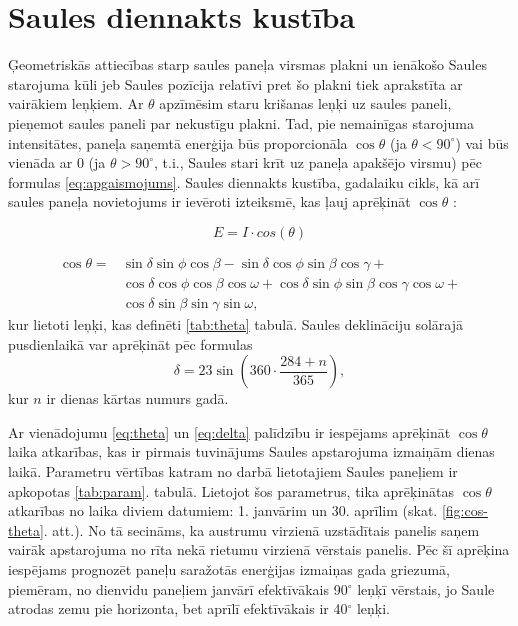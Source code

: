 
\section{Saules diennakts kustība}

Ģeometriskās attiecības starp saules paneļa virsmas plakni un ienākošo Saules starojuma kūli jeb Saules pozīcija relatīvi pret šo plakni tiek aprakstīta ar vairākiem leņķiem. Ar $\theta$ apzīmēsim staru krišanas leņķi uz saules paneli, pieņemot saules paneli par nekustīgu plakni. Tad, pie nemainīgas starojuma intensitātes, paneļa saņemtā enerģija būs proporcionāla $\cos{\theta}$ (ja $\theta<90^\circ$) vai būs vienāda ar 0 (ja $\theta>90^\circ$, t.i., Saules stari krīt uz paneļa apakšējo virsmu) pēc formulas \ref{eq:apgaismojums}. Saules diennakts kustība, gadalaiku cikls, kā arī saules paneļa novietojums ir ievēroti izteiksmē, kas ļauj aprēķināt $\cos{\theta}$ \cite{ThermalProcesses}:

\begin{equation}
\label{eq:apgaismojums}
E = I \cdot cos(\theta)
\end{equation}

\begin{equation}
\label{eq:theta}
\begin{aligned}
	\cos{\theta} = {} & \sin{\delta} \sin{\phi} \cos{\beta} - \sin{\delta} \cos{\phi} \sin{\beta} \cos{\gamma} +                           \\
	                  & \cos{\delta} \cos{\phi} \cos{\beta} \cos{\omega} + \cos{\delta} \sin{\phi} \sin{\beta} \cos{\gamma} \cos{\omega} + \\
	                  & \cos{\delta} \sin{\beta} \sin{\gamma} \sin{\omega},
\end{aligned}
\end{equation}
kur lietoti leņķi, kas definēti \ref{tab:theta} tabulā. Saules deklināciju solārajā pusdienlaikā var aprēķināt pēc formulas
\begin{equation}
\label{eq:delta}
    \delta = 23 \sin \left( 360 \cdot \frac{284+n}{365} \right),
\end{equation}
kur $n$ ir dienas kārtas numurs gadā.

Ar vienādojumu \ref{eq:theta} un \ref{eq:delta} palīdzību ir iespējams aprēķināt $\cos{\theta}$ laika atkarības, kas ir pirmais tuvinājums Saules apstarojuma izmaiņām dienas laikā.
Parametru vērtības katram no darbā lietotajiem Saules paneļiem ir apkopotas \ref{tab:param}. tabulā.
Lietojot šos parametrus, tika aprēķinātas $\cos{\theta}$ atkarības no laika diviem datumiem: 1. janvārim un 30. aprīlim (skat. \ref{fig:cos-theta}. att.). No tā secināms, ka austrumu virzienā uzstādītais panelis saņem vairāk apstarojuma no rīta nekā rietumu virzienā vērstais panelis. Pēc šī aprēķina iespējams prognozēt paneļu saražotās enerģijas izmaiņas gada griezumā, piemēram, no dienvidu paneļiem janvārī efektīvākais 90$^\circ$ leņķī vērstais, jo Saule atrodas zemu pie horizonta, bet aprīlī efektīvākais ir 40$^\circ$ leņķi.

